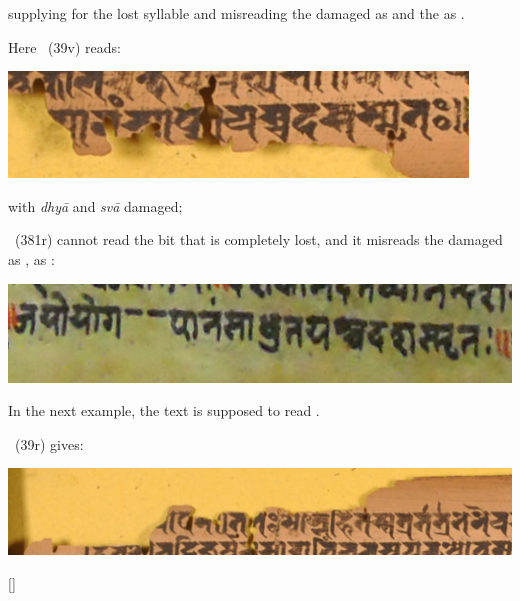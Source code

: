 \hspace{2em}

\smallskip
\noindent
supplying  for the lost syllable and misreading the 
damaged  as  and the  as .


\bigskip
\bigskip

Here \msNa\ (\fol39v) reads:

\smallskip
\includegraphics[scale=.5]{images/japoyoga_msNa.png}

  
\smallskip

\noindent
with \textit{dhyā} and \textit{svā} damaged;

\medskip

\msL\ (\fol381r) cannot read the bit that 
is completely lost, and it misreads 
the damaged  as ,  as :
\smallskip

\includegraphics[scale=.3]{images/japoyoga_msL.png}

\bigskip
\bigskip

In the next example, the text is supposed to read
.

\msNa\ (\fol39r) gives:
\smallskip

\includegraphics[scale=.21]{images/hitas_msNa.png}

\hspace{2em}[] 
\medskip

